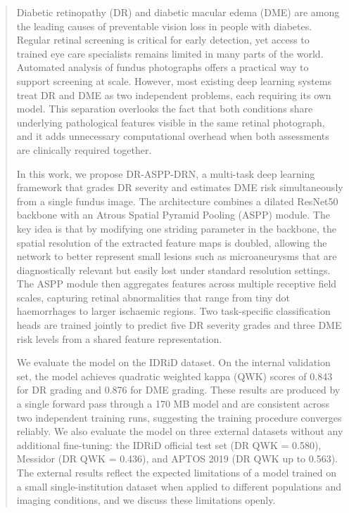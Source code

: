 \documentclass[12pt,a4paper]{article}
\begin{document}
\begin{abstract}

Diabetic retinopathy (DR) and diabetic macular edema (DME) are among the leading causes of preventable vision loss in people with diabetes. Regular retinal screening is critical for early detection, yet access to trained eye care specialists remains limited in many parts of the world. Automated analysis of fundus photographs offers a practical way to support screening at scale. However, most existing deep learning systems treat DR and DME as two independent problems, each requiring its own model. This separation overlooks the fact that both conditions share underlying pathological features visible in the same retinal photograph, and it adds unnecessary computational overhead when both assessments are clinically required together.

In this work, we propose DR-ASPP-DRN, a multi-task deep learning framework that grades DR severity and estimates DME risk simultaneously from a single fundus image. The architecture combines a dilated ResNet50 backbone with an Atrous Spatial Pyramid Pooling (ASPP) module. The key idea is that by modifying one striding parameter in the backbone, the spatial resolution of the extracted feature maps is doubled, allowing the network to better represent small lesions such as microaneurysms that are diagnostically relevant but easily lost under standard resolution settings. The ASPP module then aggregates features across multiple receptive field scales, capturing retinal abnormalities that range from tiny dot haemorrhages to larger ischaemic regions. Two task-specific classification heads are trained jointly to predict five DR severity grades and three DME risk levels from a shared feature representation.

We evaluate the model on the IDRiD dataset. On the internal validation set, the model achieves quadratic weighted kappa (QWK) scores of 0.843 for DR grading and 0.876 for DME grading. These results are produced by a single forward pass through a 170 MB model and are consistent across two independent training runs, suggesting the training procedure converges reliably. We also evaluate the model on three external datasets without any additional fine-tuning: the IDRiD official test set (DR QWK = 0.580), Messidor (DR QWK = 0.436), and APTOS 2019 (DR QWK up to 0.563). The external results reflect the expected limitations of a model trained on a small single-institution dataset when applied to different populations and imaging conditions, and we discuss these limitations openly.


\end{abstract}
\end{document}
